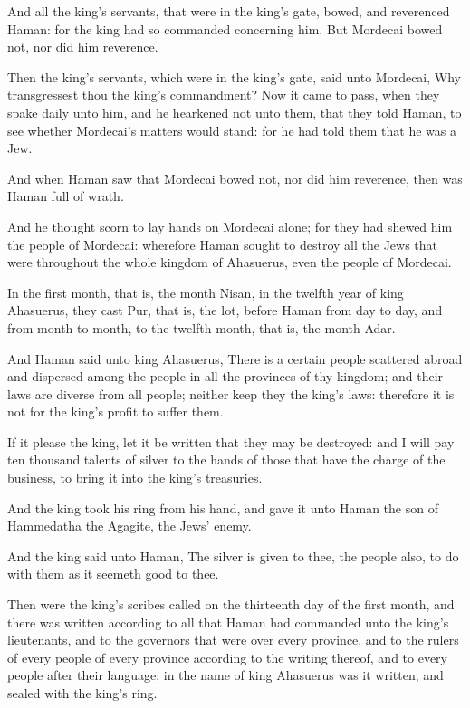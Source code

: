 \verse And all the king's servants, that were in the king's gate, bowed, and reverenced Haman: for the king had so commanded concerning him.  But Mordecai bowed not, nor did him reverence.

\verse Then the king's servants, which were in the king's gate, said unto Mordecai, Why transgressest thou the king's commandment?  \verse Now it came to pass, when they spake daily unto him, and he hearkened not unto them, that they told Haman, to see whether Mordecai's matters would stand: for he had told them that he was a Jew.

\verse And when Haman saw that Mordecai bowed not, nor did him reverence, then was Haman full of wrath.

\verse And he thought scorn to lay hands on Mordecai alone; for they had shewed him the people of Mordecai: wherefore Haman sought to destroy all the Jews that were throughout the whole kingdom of Ahasuerus, even the people of Mordecai.

\verse In the first month, that is, the month Nisan, in the twelfth year of king Ahasuerus, they cast Pur, that is, the lot, before Haman from day to day, and from month to month, to the twelfth month, that is, the month Adar.

\verse And Haman said unto king Ahasuerus, There is a certain people scattered abroad and dispersed among the people in all the provinces of thy kingdom; and their laws are diverse from all people; neither keep they the king's laws: therefore it is not for the king's profit to suffer them.

\verse If it please the king, let it be written that they may be destroyed: and I will pay ten thousand talents of silver to the hands of those that have the charge of the business, to bring it into the king's treasuries.

\verse And the king took his ring from his hand, and gave it unto Haman the son of Hammedatha the Agagite, the Jews' enemy.

\verse And the king said unto Haman, The silver is given to thee, the people also, to do with them as it seemeth good to thee.

\verse Then were the king's scribes called on the thirteenth day of the first month, and there was written according to all that Haman had commanded unto the king's lieutenants, and to the governors that were over every province, and to the rulers of every people of every province according to the writing thereof, and to every people after their language; in the name of king Ahasuerus was it written, and sealed with the king's ring.

